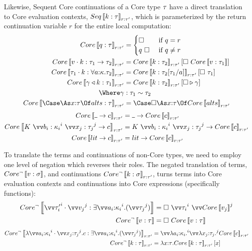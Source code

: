 \documentclass{article}
\begin{document}
Likewise, Sequent Core continuations of a Core type $\tau$ have a direct
translation to Core evaluation contexts, $Seq\left\llbracket{k: \tau}\right\rrbracket_{r{:}{\tau'}}$,
which is parameterized by the return continuation variable $r$ for the entire
local computation:
\begin{align*}
  Core\trans{q : \ty}_{\ann{r}{\ty'}}
  &=
  \begin{cases}
    \hole & \text{ if } q = r
    \\
    q ~ \hole & \text{ if } q \neq r
  \end{cases}
  \\
  Core\trans{\app{\tm}{\ko} : \ty_1 \to \ty_2}_{\ann{r}{\ty'}}
  &=
  Core\trans{\ko : \ty_2}_{\ann{r}{\ty'}}[\hole ~ Core\trans{\tm : \ty_1}]
  \\
  Core\trans{\app{\ty_1}{\ko} : \forall \ann a \ki. \ty_2}_{\ann{r}{\ty'}}
  &=
  Core\trans{\ko : \ty_2[\ty_1/a]}_{\ann{r}{\ty'}}[\hole ~ \ty_1]
  \\
  Core\trans{\koerce{\cn}{\ko} : \ty_1}_{\ann{r}{\ty'}}
  &=
  Core\trans{\ko : \ty_2}_{\ann{r}{\ty'}}[\coerce{\hole}{\cn}]
  \\
  \Where \cn &: \eqty{\ty_1}{\ty_2}
  \\
  Core\trans{\caseas{\ann{x}{\ty}}{\alts} : \ty}_{\ann{r}{\ty'}}
  &=
  \Case \hole \As \ann{x}{\ty} \Of Core\trans{\alts}_{\ann{r}{\ty'}}
\end{align*}
\begin{align*}
  Core\trans{\blank \to \com}_{\ann{r}{\ty'}}
  &=
  \blank \to Core\trans{\com}_{\ann{r}{\ty'}}
  \\
  Core\trans{K ~ \vect[i]{b_i:\ki_i} ~ \vect[j]{x_j:\ty_j} \to \com}_{\ann{r}{\ty'}}
  &=
  K ~ \vect[i]{b_i:\ki_i} ~ \vect[j]{x_j:\ty_j} \to Core\trans{\com}_{\ann{r}{\ty'}}
  \\
  Core\trans{\lit \to \com}_{\ann{r}{\ty'}}
  &=
  \lit \to Core\trans{\com}_{\ann{r}{\ty'}}
\end{align*}

To translate the terms and continuations of non-Core types, we need to employ
one level of negation which reverses their roles.  The negated translation of
terms, $Core^\neg\left\llbracket{v: \sigma}\right\rrbracket$, and continuations
$Core^\neg\left\llbracket{k: \sigma}\right\rrbracket_{r:\tau'}$, turns terms into Core evaluation
contexts and continuations into Core expressions (specifically functions):
\begin{align*}
  Core^\neg\trans{
    \packs{\vect[i]{\ty'_i}}{\vect[j]{\tm_j}}
  : \stackty{\vect[i]{\ann{a_i}{\ki_i}}}{\vect[j]{\ty_j}}
  }
  &=
  \hole ~ \vect[i]{\ty_i} ~ \vect[j]{Core\trans{\tm_j}}
  \\
  Core^\neg\trans{\tm : \ty}
  &=
  \hole ~ Core\trans{\tm : \ty}
\end{align*}
\begin{align*}
  Core^\neg\trans{
    \fnk{\packs{\vect[i]{\ann{a_i}{\ki_i}}}{\vect[j]{\ann{x_j}{\ty_j}}}} \com
  : \stackty{\vect[i]{\ann{a_i}{\ki_i}}}{\vect[j]{\ty_j}}
  }_{\ann{r}{\ty'}}
  &=
  \vect[i]{\fn{\ann{a_i}{\ki_i}}}\vect[j]{\fn{\ann{x_j}{\ty_j}}}
    Core\trans{\com}_{\ann{r}{\ty'}}
  \\
  Core^\neg\trans{\ko : \ty}_{\ann{r}{\ty'}}
  &=
  \fn{\ann x \ty} Core\trans{\ko : \ty}_{\ann{r}{\ty'}}[x]
\end{align*}
\end{document}
